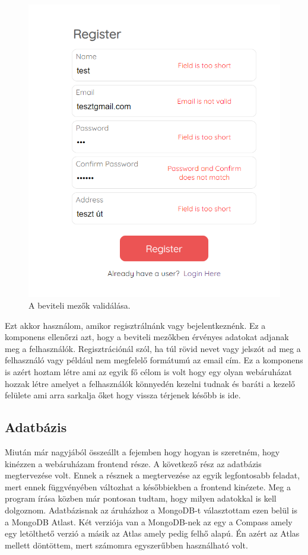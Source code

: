 \begin{figure}[h]
\centering
\includegraphics[scale=0.6]{images/validation.png}
\caption{A beviteli mezők validálása.}
\label{fig:validacio}
\end{figure}

Ezt akkor használom, amikor regisztrálnánk vagy bejelentkeznénk. Ez a komponens ellenőrzi azt, hogy a beviteli mezőkben érvényes adatokat adjanak meg a felhasználók. Regisztrációnál szól, ha túl rövid nevet vagy jelszót ad meg a felhasználó vagy például nem megfelelő formátumú az email cím. Ez a komponens is azért hoztam létre ami az egyik fő célom is volt hogy egy olyan webáruházat hozzak létre amelyet a felhasználók könnyedén kezelni tudnak és baráti a kezelő felülete ami arra sarkalja őket hogy vissza térjenek később is ide.

\subsection{Adatbázis}
Miután már nagyjából összeállt a fejemben hogy hogyan is szeretném, hogy kinézzen a webáruházam frontend része. A következő rész az adatbázis megtervezése volt. Ennek a résznek a megtervezése az egyik legfontosabb feladat, mert ennek függvényében változhat a későbbiekben a frontend kinézete. Meg a program írása közben már pontosan tudtam, hogy milyen adatokkal is kell dolgoznom. Adatbázisnak az áruházhoz a MongoDB-t választottam ezen belül is a MongoDB Atlast. Két verziója van a MongoDB-nek az egy a Compass amely egy letölthető verzió a másik az Atlas amely pedig felhő alapú. Én azért az Atlas mellett döntöttem, mert számomra egyszerűbben használható volt.

